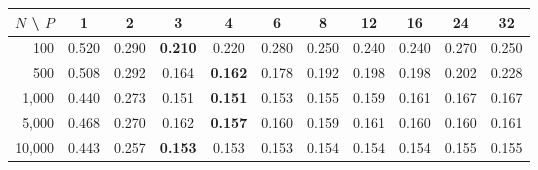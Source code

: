 \begin{tabular}{rcccccccccc}
\toprule
$N$ \textbackslash{} $P$ & 1 & 2 & 3 & 4 & 6 & 8 & 12 & 16 & 24 & 32 \\
\midrule
100 & 0.520 & 0.290 & \textbf{0.210} & 0.220 & 0.280 & 0.250 & 0.240 & 0.240 & 0.270 & 0.250 \\
500 & 0.508 & 0.292 & 0.164 & \textbf{0.162} & 0.178 & 0.192 & 0.198 & 0.198 & 0.202 & 0.228 \\
1,000 & 0.440 & 0.273 & 0.151 & \textbf{0.151} & 0.153 & 0.155 & 0.159 & 0.161 & 0.167 & 0.167 \\
5,000 & 0.468 & 0.270 & 0.162 & \textbf{0.157} & 0.160 & 0.159 & 0.161 & 0.160 & 0.160 & 0.161 \\
10,000 & 0.443 & 0.257 & \textbf{0.153} & 0.153 & 0.153 & 0.154 & 0.154 & 0.154 & 0.155 & 0.155 \\
\bottomrule
\end{tabular}